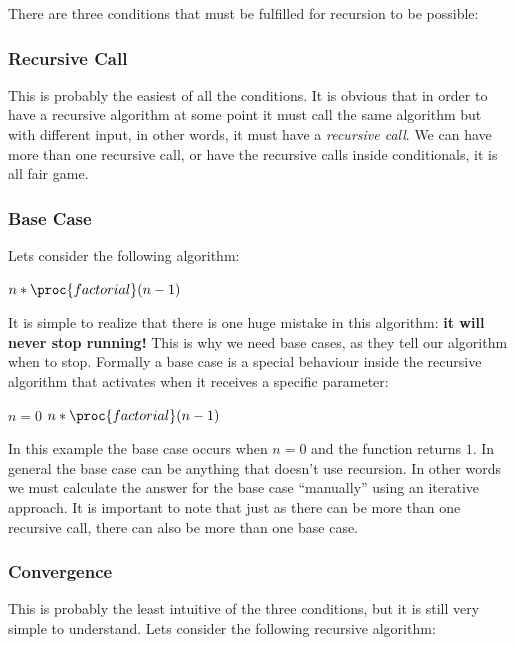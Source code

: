 \documentclass{article}
\begin{document}
There are three conditions that must be fulfilled for recursion to be possible:

\subsubsection{Recursive Call}

This is probably the easiest of all the conditions. It is obvious that in order to have a recursive algorithm at some point it must call the same algorithm but with different input, in other words, it must have a \textit{recursive call}. We can have more than one recursive call, or have the recursive calls inside conditionals, it is all fair game.

\subsubsection{Base Case}

Lets consider the following algorithm:

\begin{codebox}
	\li \Return  $n * \proc{factorial}(n - 1)$
\end{codebox}

It is simple to realize that there is one huge mistake in this algorithm: \textbf{it will never stop running!} This is why we need base cases, as they tell our algorithm when to stop. Formally a base case is a special behaviour inside the recursive algorithm that activates when it receives a specific parameter:

\begin{codebox}
\li \If $n = 0$
	\li \Then 
	\End
\li \Return  $n * \proc{factorial}(n - 1)$
\end{codebox}

In this example the base case occurs when $n = 0$ and the function returns $1$. In general the base case can be anything that doesn't use recursion. In other words we must calculate the answer for the base case ``manually'' using an iterative approach. It is important to note that just as there can be more than one recursive call, there can also be more than one base case.

\subsubsection{Convergence}

This is probably the least intuitive of the three conditions, but it is still very simple to understand. Lets consider the following recursive algorithm:
\end{document}
